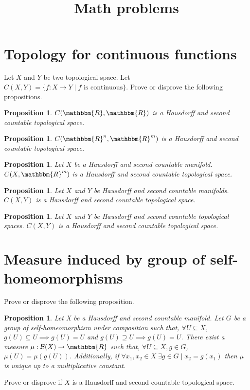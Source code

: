 \documentclass[aps,pra,10pt,twocolumn,floatfix,nofootinbib]{revtex4-1}
\newtheorem{prop}[equation]{Proposition}
\begin{document}
\title{Math problems}

\maketitle

\section{Topology for continuous functions}

Let $X$ and $Y$ be two topological space. Let $C(X, Y) = \{f:X \rightarrow Y \; | \; f \text{ is continuous} \}$. Prove or disprove the following propositions.

\begin{prop}
	$C(\mathbbm{R}, \mathbbm{R})$ is a Hausdorff and second countable topological space. 
\end{prop}

\begin{prop}
	$C(\mathbbm{R}^n, \mathbbm{R}^m)$ is a Hausdorff and second countable topological space. 
\end{prop}

\begin{prop}
	Let $X$ be a Hausdorff and second countable manifold. $C(X, \mathbbm{R}^m)$ is a Hausdorff and second countable topological space. 
\end{prop}

\begin{prop}
	Let $X$ and $Y$ be Hausdorff and second countable manifolds. $C(X, Y)$ is a Hausdorff and second countable topological space. 
\end{prop}

\begin{prop}
	Let $X$ and $Y$ be Hausdorff and second countable topological spaces. $C(X, Y)$ is a Hausdorff and second countable topological space. 
\end{prop}

\section{Measure induced by group of self-homeomorphisms}

Prove or disprove the following proposition.

\begin{prop}
	Let X be a Hausdorff and second countable manifold. Let $G$ be a group of self-homeomorphism under composition such that, $\forall U \subseteq X$, $g(U) \subseteq U \implies g(U) = U$ and $g(U) \supseteq U \implies g(U) = U$. There exist a measure $\mu : \mathcal{B}(X) \rightarrow \mathbbm{R}$ such that, $\forall U \subseteq X, g \in G$, $\mu(U) = \mu(g(U))$. Additionally, if $\forall x_1, x_2 \in X \; \exists g \in G \;|\; x_2=g(x_1)$ then $\mu$ is unique up to a multiplicative constant.
\end{prop}

Prove or disprove if $X$ is a Hausdorff and second countable topological space.
\end{document}

